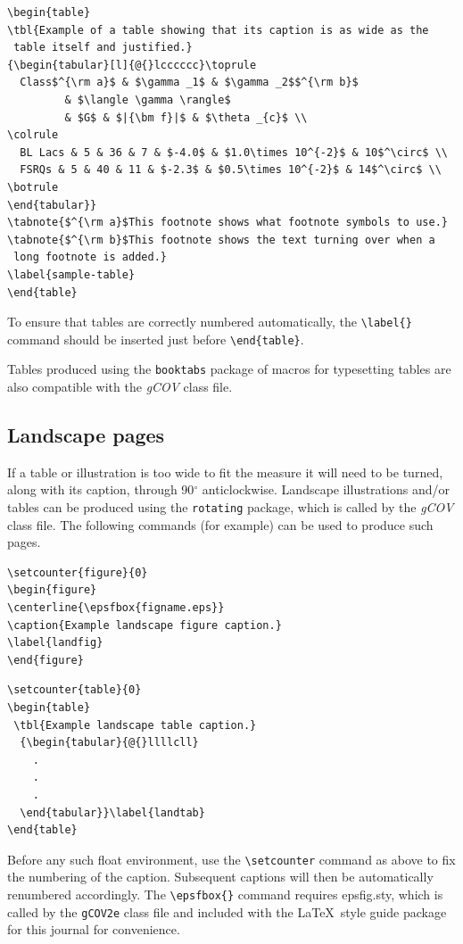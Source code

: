 \documentclass{gCOV2e}
\theoremstyle{plain}%
\theoremstyle{definition}
\theoremstyle{remark}
\begin{document}
\begin{verbatim}
\begin{table}
\tbl{Example of a table showing that its caption is as wide as the
 table itself and justified.}
{\begin{tabular}[l]{@{}lcccccc}\toprule
  Class$^{\rm a}$ & $\gamma _1$ & $\gamma _2$$^{\rm b}$
         & $\langle \gamma \rangle$
         & $G$ & $|{\bm f}|$ & $\theta _{c}$ \\
\colrule
  BL Lacs & 5 & 36 & 7 & $-4.0$ & $1.0\times 10^{-2}$ & 10$^\circ$ \\
  FSRQs & 5 & 40 & 11 & $-2.3$ & $0.5\times 10^{-2}$ & 14$^\circ$ \\
\botrule
\end{tabular}}
\tabnote{$^{\rm a}$This footnote shows what footnote symbols to use.}
\tabnote{$^{\rm b}$This footnote shows the text turning over when a
 long footnote is added.}
\label{sample-table}
\end{table}
\end{verbatim}

To ensure that tables are correctly numbered automatically, the \verb"\label{}" command should be inserted just before \verb"\end{table}".

Tables produced using the \texttt{booktabs} package of macros for typesetting tables are also compatible with the \textit{gCOV} class file.


\subsection{Landscape pages}\label{landscape}

If a table or illustration is too wide to fit the measure it will need to be turned, along with its caption, through 90$^{\circ}$ anticlockwise.
Landscape illustrations and/or tables can be produced using the \verb"rotating" package, which is called by the \textit{gCOV} class file.
The following commands (for example) can be used to produce such pages.
\begin{verbatim}
\setcounter{figure}{0}
\begin{figure}
\centerline{\epsfbox{figname.eps}}
\caption{Example landscape figure caption.}
\label{landfig}
\end{figure}
\end{verbatim}

\begin{verbatim}
\setcounter{table}{0}
\begin{table}
 \tbl{Example landscape table caption.}
  {\begin{tabular}{@{}llllcll}
    .
    .
    .
  \end{tabular}}\label{landtab}
\end{table}
\end{verbatim}
Before any such float environment, use the \verb"\setcounter" command as above to fix the numbering of the caption.
Subsequent captions will then be automatically renumbered accordingly.
The \verb"\epsfbox{}" command requires epsfig.sty, which is called by the \texttt{gCOV2e} class file and included with the \LaTeX\ style guide package for this journal for convenience.
\end{document}
